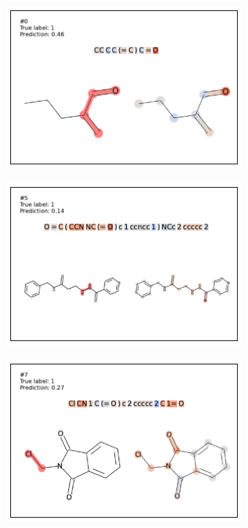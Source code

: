 
\begin{figure}
    \centering
\begin{subfigure}[b]{0.33\textwidth} 
  \centering 
  \includegraphics[width=\textwidth]{figures/ames/ames0.pdf} 
\end{subfigure}\begin{subfigure}[b]{0.33\textwidth} 
  \centering 
  \includegraphics[width=\textwidth]{figures/ames/ames5.pdf} 
\end{subfigure}\begin{subfigure}[b]{0.33\textwidth} 
  \centering 
  \includegraphics[width=\textwidth]{figures/ames/ames7.pdf} 

\end{subfigure}
\end{figure}
